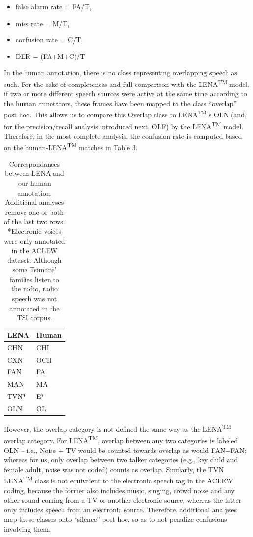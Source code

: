 \documentclass[english,floatsintext,man]{apa6}
\providecommand{\tightlist}{%
  \setlength{\itemsep}{0pt}\setlength{\parskip}{0pt}}
\begin{document}
\begin{itemize}
\tightlist
\item
  false alarm rate = FA/T,
\item
  miss rate = M/T,
\item
  confusion rate = C/T,
\item
  DER = (FA+M+C)/T
\end{itemize}

In the human annotation, there is no class representing overlapping
speech as such. For the sake of completeness and full comparison with
the LENA\textsuperscript{TM} model, if two or more different speech
sources were active at the same time according to the human annotators,
these frames have been mapped to the class \enquote{overlap} post hoc.
This allows us to compare this Overlap class to
LENA\textsuperscript{TM}'s OLN (and, for the precision/recall analysis
introduced next, OLF) by the LENA\textsuperscript{TM} model. Therefore,
in the most complete analysis, the confusion rate is computed based on
the human-LENA\textsuperscript{TM} matches in Table 3.

\begin{table}[t]

\caption{\label{tab:tab-tsicor}Correspondances between LENA and our human annotation. Additional analyses remove one or both of the last two rows. *Electronic voices were only annotated in the ACLEW dataset. Although some Tsimane' families listen to the radio, radio speech was not annotated in the TSI corpus.}
\centering
\begin{tabular}{>{\raggedright\arraybackslash}p{2cm}>{\raggedright\arraybackslash}p{2cm}}
\toprule
LENA & Human\\
\midrule
CHN & CHI\\
CXN & OCH\\
FAN & FA\\
MAN & MA\\
TVN* & E*\\
\addlinespace
OLN & OL\\
\bottomrule
\end{tabular}
\end{table}

However, the overlap category is not defined the same way as the
LENA\textsuperscript{TM} overlap category. For LENA\textsuperscript{TM},
overlap between any two categories is labeled OLN -- i.e., Noise + TV
would be counted towards overlap as would FAN+FAN; whereas for us, only
overlap between two talker categories (e.g., key child and female adult,
noise was not coded) counts as overlap. Similarly, the TVN
LENA\textsuperscript{TM} class is not equivalent to the electronic
speech tag in the ACLEW coding, because the former also includes music,
singing, crowd noise and any other sound coming from a TV or another
electronic source, whereas the latter only includes speech from an
electronic source. Therefore, additional analyses map these classes onto
\enquote{silence} post hoc, so as to not penalize confusions involving
them.
\end{document}
